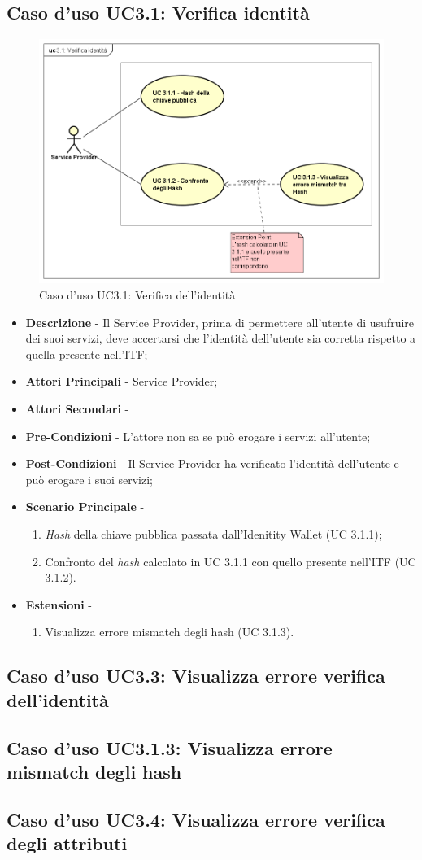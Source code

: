 \subsection{Caso d'uso UC3.1: Verifica identità}
\begin{figure}[h]
	\centering
	\includegraphics[scale=0.50]{immagini/usecase/UC31_VerificaIdentita}
	\caption{Caso d'uso UC3.1: Verifica dell'identità}
\end{figure}
\begin{itemize}
	\item \textbf{Descrizione} -  Il Service Provider, prima di permettere all'utente di usufruire dei suoi servizi, deve accertarsi che l'identità dell'utente sia corretta rispetto a quella presente nell'\gls{ITF};
	\item \textbf{Attori Principali} - Service Provider;
	\item \textbf{Attori Secondari} -
	\item \textbf{Pre-Condizioni} - L'attore non sa se può erogare i servizi all'utente;
	\item \textbf{Post-Condizioni} - Il Service Provider ha verificato l'identità dell'utente e può erogare i suoi servizi;
	\item \textbf{Scenario Principale} -
	\begin{enumerate}
		\item \textit{Hash} della chiave pubblica passata dall'Idenitity Wallet (UC 3.1.1);
		\item Confronto del \textit{hash} calcolato in UC 3.1.1 con quello presente nell'\gls{ITF} (UC 3.1.2).
	\end{enumerate}
	\item \textbf{Estensioni} -
	\begin{enumerate}
		\item Visualizza errore mismatch degli hash (UC 3.1.3).
	\end{enumerate}
\end{itemize}
\subsection{Caso d'uso UC3.3: Visualizza errore verifica dell'identità}
\subsection{Caso d'uso UC3.1.3: Visualizza errore mismatch degli hash}
\subsection{Caso d'uso UC3.4: Visualizza errore verifica degli attributi}